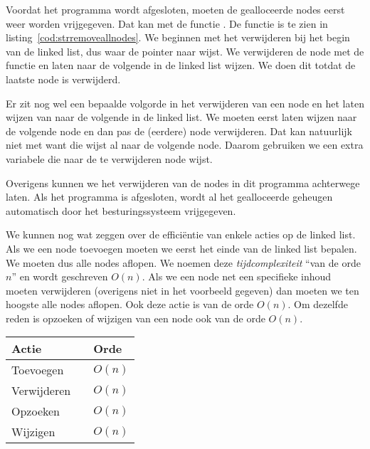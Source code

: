 
Voordat het programma wordt afgesloten, moeten de gealloceerde nodes eerst weer worden vrijgegeven. Dat kan met de functie . De functie is te zien in listing~\ref{cod:strremoveallnodes}. We beginnen met het verwijderen bij het begin van de linked list, dus waar de pointer  naar wijst. We verwijderen de node met de functie  en laten  naar de volgende in de linked list wijzen. We doen dit totdat de laatste node is verwijderd.

Er zit nog wel een bepaalde volgorde in het verwijderen van een node en het laten wijzen van  naar de volgende in de linked list. We moeten  eerst laten wijzen naar de volgende node en dan pas de (eerdere) node verwijderen. Dat kan natuurlijk niet met  want die wijst al naar de volgende node. Daarom gebruiken we een extra variabele  die naar de te verwijderen node wijst.


Overigens kunnen we het verwijderen van de nodes in dit programma achterwege laten. Als het programma is afgesloten, wordt al het gealloceerde geheugen automatisch door het besturingssysteem vrijgegeven.

We kunnen nog wat zeggen over de efficiëntie van enkele acties op de linked list. Als we een node toevoegen moeten we eerst het einde van de linked list bepalen. We moeten dus alle nodes aflopen. We noemen deze \textsl{tijdcomplexiteit} ``van de orde $n$'' en wordt geschreven $O(n)$. Als we een node net een specifieke inhoud moeten verwijderen (overigens niet in het voorbeeld gegeven) dan moeten we ten hoogste alle nodes aflopen. Ook deze actie is van de orde $O(n)$. Om dezelfde reden is opzoeken of wijzigen van een node ook van de orde $O(n)$.

\begin{table}[!ht]
\begin{tabular}{lp{1em}l}
Actie && Orde \\
\midrule
Toevoegen && $O(n)$ \\
Verwijderen && $O(n)$ \\
Opzoeken && $O(n)$ \\
Wijzigen && $O(n)$
\end{tabular}
\end{table}
\basic

